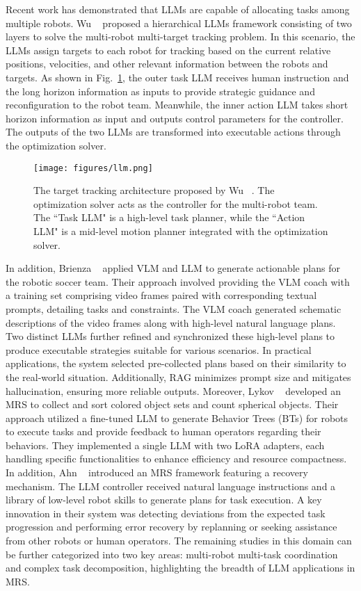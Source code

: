 Recent work has demonstrated that LLMs are capable of allocating tasks among multiple robots. Wu \etal~\cite{wu_hierarchical_2024} proposed a hierarchical LLMs framework consisting of two layers to solve the multi-robot multi-target tracking problem. In this scenario, the LLMs assign targets to each robot for tracking based on the current relative positions, velocities, and other relevant information between the robots and targets. As shown in Fig.~\ref{fig:llm_wu}, the outer task LLM receives human instruction and the long horizon information as inputs to provide strategic guidance and reconfiguration to the robot team. Meanwhile, the inner action LLM takes short horizon information as input and outputs control parameters for the controller. The outputs of the two LLMs are transformed into executable actions through the optimization solver.
\begin{figure}[ht]
    \centering
    \texttt{[image: figures/llm.png]}
    \caption{The target tracking architecture proposed by Wu \etal~\cite{wu_hierarchical_2024}. The optimization solver acts as the controller for the multi-robot team. The ``Task LLM" is a high-level task planner, while the ``Action LLM" is a mid-level motion planner integrated with the optimization solver.}
    \label{fig:llm_wu}
\end{figure}
In addition, Brienza \etal~\cite{brienza_llcoach_2024} applied VLM and LLM to generate actionable plans for the robotic soccer team. Their approach involved providing the VLM coach with a training set comprising video frames paired with corresponding textual prompts, detailing tasks and constraints. The VLM coach generated schematic descriptions of the video frames along with high-level natural language plans. Two distinct LLMs further refined and synchronized these high-level plans to produce executable strategies suitable for various scenarios. In practical applications, the system selected pre-collected plans based on their similarity to the real-world situation. Additionally, RAG minimizes prompt size and mitigates hallucination, ensuring more reliable outputs. 
Moreover, Lykov \etal~\cite{lykov_llm-mars_2023} developed an MRS to collect and sort colored object sets and count spherical objects. Their approach utilized a fine-tuned LLM to generate Behavior Trees (BTs) for robots to execute tasks and provide feedback to human operators regarding their behaviors. They implemented a single LLM with two LoRA adapters, each handling specific functionalities to enhance efficiency and resource compactness. 
In addition, Ahn \etal~\cite{ahn_vader_2024} introduced an MRS framework featuring a recovery mechanism. The LLM controller received natural language instructions and a library of low-level robot skills to generate plans for task execution. A key innovation in their system was detecting deviations from the expected task progression and performing error recovery by replanning or seeking assistance from other robots or human operators. The remaining studies in this domain can be further categorized into two key areas: multi-robot multi-task coordination and complex task decomposition, highlighting the breadth of LLM applications in MRS.

